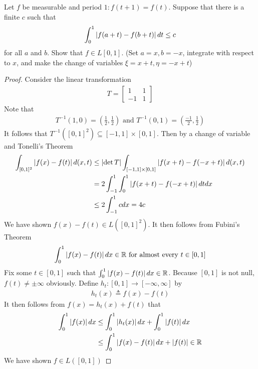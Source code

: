 \documentclass{report}
\begin{document}
\begin{question}{}{}
Let $f$ be measurable and period $1:f(t+1)=f(t)$. Suppose that there is a finite $c$ such that 
\begin{align*}
\int_0^1 \left|f(a+t)-f(b+t)\right|dt \leq c
\end{align*}
for all $a$ and $b$. Show that  $f \in L[0,1]$. (Set $a=x,b=-x$, integrate with respect to $x$, and make the change of variables  $\xi =x+t,\eta =-x +t $)
\end{question}
\begin{proof}
Consider the linear transformation 
\begin{align*}
T= \begin{bmatrix}
 1 & 1\\
 -1 & 1
\end{bmatrix}
\end{align*}
Note that 
\begin{align*}
T^{-1}(1,0)=(\frac{1}{2},\frac{1}{2})\text{ and }T^{-1}(0,1)=(\frac{-1}{2},\frac{1}{2})
\end{align*}
It follows that $T^{-1}([0,1]^2)\subseteq [-1,1]\times [0,1] $. Then by a change of variable and Tonelli's Theorem
\begin{align*}
  \int_{[0,1]^2}\left|f(x)-f(t) \right| d(x,t )&\leq   \left|\operatorname{det}T\right|\int_{[-1,1]\times [0,1]} \left|f(x+t)-f(-x+t)\right|  d(x,t)  \\
  &=  2\int_{-1}^1 \int_{0}^1 \left|f(x+t)-f(-x+t)\right|dtdx \\
  &\leq 2\int_{-1}^{1} cdx=4c
\end{align*}
We have shown $f(x)-f(t)\in L([0,1]^2)$. It then follows from Fubini's Theorem 
\begin{align*}
\int_0^1 \left|f(x)-f(t)\right|dx \in\mathbb{R} \text{ for almost every }t \in [0,1]
\end{align*}
Fix some $t \in [0,1]$ such that $\int_0^1 \left|f(x)-f(t)\right|dx\in\mathbb{R}$. Because $[0,1]$ is not null, $f(t)\neq \pm \infty$ obviously. Define  $h_t:[0,1]\rightarrow [-\infty,\infty]$ by 
\begin{align*}
h_t(x)\triangleq f(x)-f(t)
\end{align*}
It then follows from $f(x)=h_t(x)+f(t)$ that 
\begin{align*}
  \int_0^1 \left|f(x)\right|dx&\leq \int_0^1 \left|h_t(x)\right|dx + \int_0^1 \left|f(t)\right|dx  \\
  &\leq \int_0^1 \left|f(x)-f(t)\right|dx + \left|f(t)\right|\in\mathbb{R}
\end{align*}
We have shown $f \in L([0,1])$

\end{proof}
\end{document}
